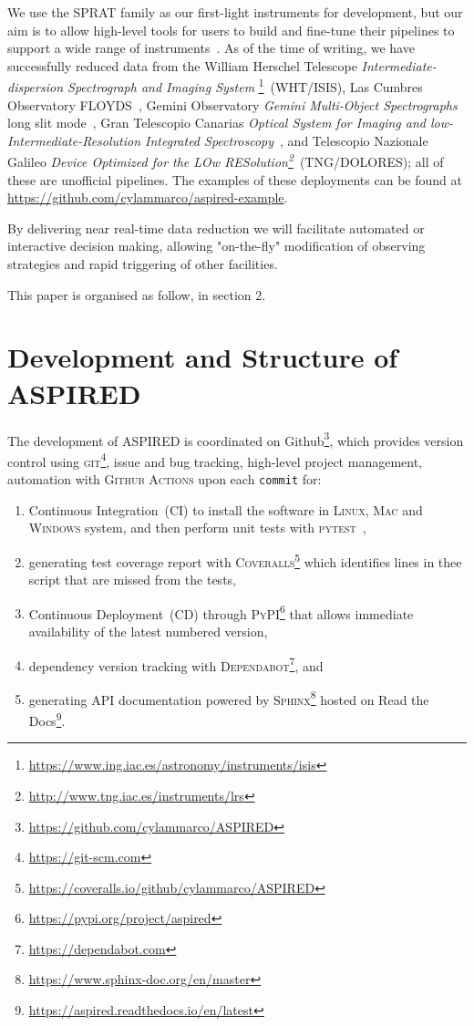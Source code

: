 \documentclass[fleqn,usenatbib]{mnras}
\begin{document}
We use the SPRAT family as our first-light instruments for development, but our aim is to
allow high-level tools for users to build and fine-tune their pipelines to support
a wide range of instruments~\citep{2020arXiv201203505L, marco_2021_4463569}. As of the time of
writing, we have successfully reduced data from the William Herschel Telescope
\textit{Intermediate-dispersion Spectrograph and Imaging System}
\footnote{\url{https://www.ing.iac.es/astronomy/instruments/isis}}~(WHT/ISIS), Las Cumbres
Observatory FLOYDS~\citep[LCO/FLOYDS]{2013PASP..125.1031B}, Gemini Observatory
\textit{Gemini Multi-Object Spectrographs} long slit
mode~\citep[Gemini/GMOS-LS]{2004PASP..116..425H}, Gran Telescopio Canarias \textit{Optical
System for Imaging and low-Intermediate-Resolution Integrated
Spectroscopy}~\citep[GTC/OSIRIS]{2000SPIE.4008..623C}, and Telescopio Nazionale Galileo
\textit{Device Optimized for the LOw
RESolution\footnote{\url{http://www.tng.iac.es/instruments/lrs}}}~(TNG/DOLORES); all of
these are unofficial pipelines. The examples of these deployments can be found at
\url{https://github.com/cylammarco/aspired-example}.

By delivering near real-time data reduction we will facilitate automated or interactive
decision making, allowing "on-the-fly" modification of observing strategies and rapid
triggering of other facilities.

This paper is organised as follow, in section 2.

\section{Development and Structure of ASPIRED}
The development of ASPIRED is coordinated on Github\footnote{\url{https://github.com/cylammarco/ASPIRED}}, which provides version control using \textsc{git}\footnote{\url{https://git-scm.com}}, issue and bug tracking, high-level project management, automation with \textsc{Github Actions} upon each \texttt{commit} for:

\begin{enumerate}
    \item Continuous Integration~(CI) to install the software in \textsc{Linux}, \textsc{Mac} and \textsc{Windows} system, and then perform unit tests with \textsc{pytest}~\citep{pytest6.2},
    \item generating test coverage report with \textsc{Coveralls}\footnote{\url{https://coveralls.io/github/cylammarco/ASPIRED}} which identifies lines in thee script that are missed from the tests,
    \item Continuous Deployment~(CD) through \textsc{PyPI}\footnote{\url{https://pypi.org/project/aspired}} that allows immediate availability of the latest numbered version,
    \item dependency version tracking with \textsc{Dependabot}\footnote{\url{https://dependabot.com}}, and
    \item generating API documentation powered by \textsc{Sphinx}\footnote{\url{https://www.sphinx-doc.org/en/master}} hosted on Read the Docs\footnote{\url{https://aspired.readthedocs.io/en/latest}}.
\end{enumerate}
\end{document}
